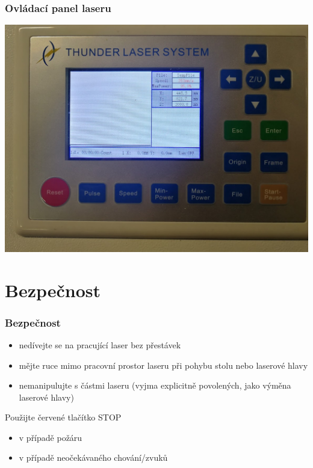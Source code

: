 \documentclass[14pt]{beamer}
\begin{document}
\begin{frame}
\frametitle{Ovládací panel laseru}

\centering
\includegraphics[scale=0.2]{imgs/laser_cp.jpg}

\end{frame}


\section{Bezpečnost}
\begin{frame}
\frametitle{Bezpečnost}

\begin{itemize}
	\item nedívejte se na pracující laser bez přestávek
	\item mějte ruce mimo pracovní prostor laseru při pohybu stolu nebo laserové hlavy
	\item nemanipulujte s částmi laseru (vyjma explicitně povolených, jako výměna laserové hlavy)
\end{itemize}

\begin{alertblock}{Použijte červené tlačítko STOP}
	\begin{itemize}
		\item v případě požáru
		\item v případě neočekávaného chování/zvuků
	\end{itemize}
\end{alertblock}

\end{frame}
\end{document}
